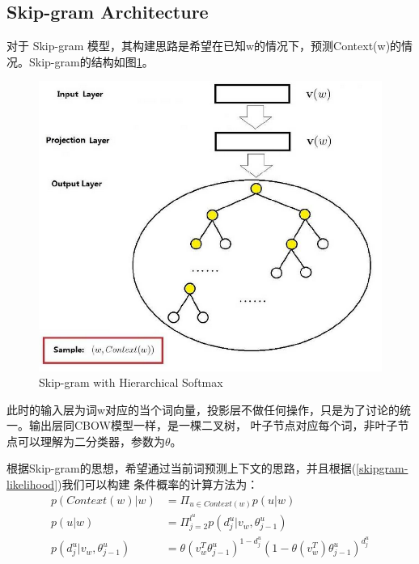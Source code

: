 \documentclass[UTF8]{ctexart}
\begin{document}
\subsection{Skip-gram Architecture}
对于 Skip-gram 模型，其构建思路是希望在已知w的情况下，预测Context(w)的情况。Skip-gram的结构如图\ref{Fig:skip-hs}。
\begin{figure}[h!]
    \centering     
    \includegraphics[width=1.0\textwidth]{skipgram-hs}   
    \caption{\label{Fig:skip-hs}Skip-gram with Hierarchical Softmax} 
\end{figure}
此时的输入层为词w对应的当个词向量，投影层不做任何操作，只是为了讨论的统一。输出层同CBOW模型一样，是一棵二叉树，
叶子节点对应每个词，非叶子节点可以理解为二分类器，参数为$\theta$。
\par
根据Skip-gram的思想，希望通过当前词预测上下文的思路，并且根据(\ref{skipgram-likelihood})我们可以构建
条件概率的计算方法为：
\begin{align}
p(Context(w)|w) &= \Pi_{u \in Context(w)} p(u|w) 
\\
p(u|w) &= \Pi_{j=2}^{l^u} p(d_j^u|v_w, \theta_{j-1}^u)
\\
p(d_j^u|v_w, \theta_{j-1}^u) &= \theta(v_w^T \theta_{j-1}^u)^{1-d_j^u} %
(1-\theta(v_w^T)\theta_{j-1}^u)^{d_j^u}
\end{align}
\end{document}

